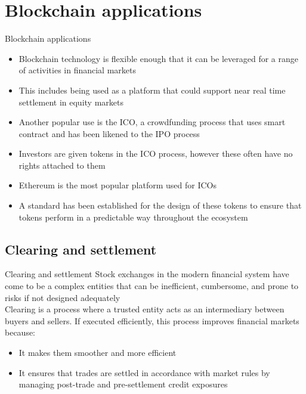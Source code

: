 \documentclass[10pt]{beamer}
\begin{document}
\section{Blockchain applications}

\begin{frame}
	\begin{center}
		\begin{large}
			Blockchain applications
		\end{large}
	\end{center}
\end{frame}


\begin{frame}{}
	\begin{itemize}
		\item Blockchain technology is flexible enough that it can be leveraged for a range of activities in financial markets
		\item This includes being used as a platform that could support near real time settlement in equity markets
		\item Another popular use is the ICO, a crowdfunding process that uses smart contract and has been likened to the IPO process
		\item Investors are given tokens in the ICO process, however these often have no rights attached to them
		\item Ethereum is the most popular platform used for ICOs
		\item A standard has been established for the design of these tokens to ensure that tokens perform in a predictable way throughout the ecosystem
	\end{itemize}
\end{frame}

%

\subsection{Clearing and settlement}

\begin{frame}{Clearing and settlement}
	Stock exchanges in the modern financial system have come to be a complex entities that can be inefficient, cumbersome, and prone to risks if not designed adequately\\ \vspace{3mm}
	Clearing is a process where a trusted entity acts as an intermediary between buyers and sellers. If executed efficiently, this process improves financial markets because:
	\begin{itemize}
		\item It makes them smoother and more efficient
		\item It ensures that trades are settled in accordance with market rules by managing post-trade and pre-settlement credit exposures
	\end{itemize}
\end{frame}
\end{document}
